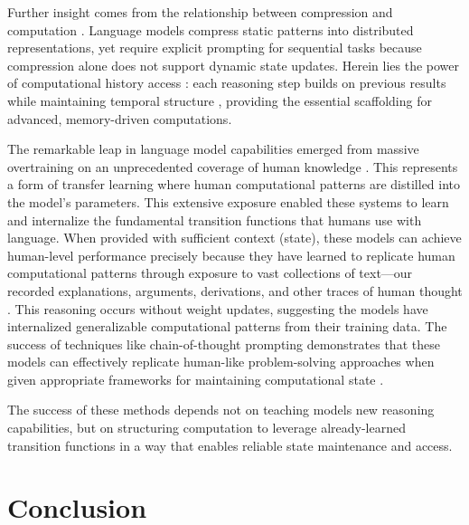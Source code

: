 \documentclass[12pt]{article}
\begin{document}
Further insight comes from the relationship between compression and computation \cite{dickson2024trust}.
Language models compress static patterns into distributed representations, yet require explicit prompting for sequential tasks because compression alone does not support dynamic state updates.
Herein lies the power of computational history access \cite{fu2024memory}: each reasoning step builds on previous results while maintaining temporal structure \cite{wei2022chain}, providing the essential scaffolding for advanced, memory-driven computations.

The remarkable leap in language model capabilities emerged from massive overtraining on an unprecedented coverage of human knowledge \cite{schuurmans2024autoregressive}.
This represents a form of transfer learning where human computational patterns are distilled into the model's parameters.
This extensive exposure enabled these systems to learn and internalize the fundamental transition functions that humans use with language.
When provided with sufficient context (state), these models can achieve human-level performance precisely because they have learned to replicate human computational patterns through exposure to vast collections of text---our recorded explanations, arguments, derivations, and other traces of human thought \cite{brown2020language,wei2022chain}.
This reasoning occurs without weight updates, suggesting the models have internalized generalizable computational patterns from their training data.
The success of techniques like chain-of-thought prompting demonstrates that these models can effectively replicate human-like problem-solving approaches when given appropriate frameworks for maintaining computational state \cite{wei2022emergent}.

The success of these methods depends not on teaching models new reasoning capabilities, but on structuring computation to leverage already-learned transition functions in a way that enables reliable state maintenance and access.


\section{Conclusion}
\end{document}
